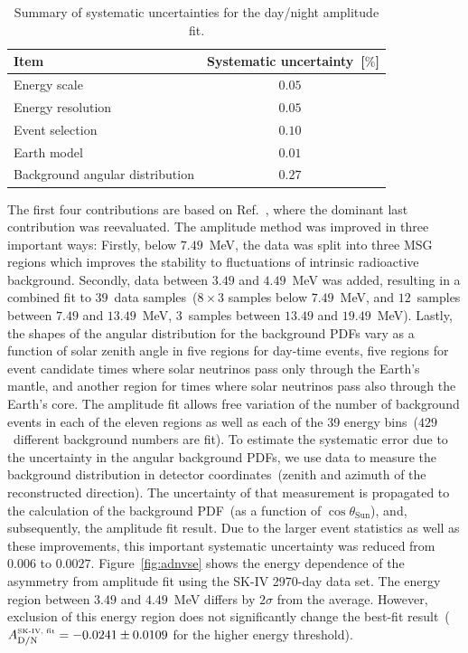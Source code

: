 \documentclass[aps,prd,reprint,superscriptaddress,floatfix,altaffilletter,nofootinbib]{revtex4-2}
\begin{document}
\begin{table}[htp]
    \begin{center}
    \caption{Summary of systematic uncertainties for the day/night amplitude fit.} 
    \label{tb:sys_dn}
        \begin{tabular}{lc}
        \hline
        \hline
        Item & Systematic uncertainty~[$\%$] \\ \hline
        Energy scale & $0.05\phantom{0}$ \\
        Energy resolution & $0.05\phantom{0}$ \\
        Event selection & $0.10\phantom{0}$ \\
        Earth model & $0.01\phantom{0}$ \\
        Background angular distribution & $0.27\phantom{0}$ \\   \hline
        \hline
        \end{tabular}
    \end{center}
\end{table}

The first four contributions are based on Ref.~\cite{Renshaw:2013dzu}, where the dominant last contribution was reevaluated. The amplitude method was improved in three important ways: Firstly, below $7.49$~MeV, the data was split into three MSG regions which improves the stability to fluctuations of intrinsic radioactive background. Secondly, data between $3.49$ and $4.49$~MeV was added, resulting in a combined fit to $39$~data samples~($8\times3$ samples below $7.49$~MeV, and $12$~samples between $7.49$ and $13.49$~MeV, $3$~samples between $13.49$ and $19.49$~MeV). Lastly, the shapes of the angular distribution for the background PDFs vary as a function of solar zenith angle in five regions for day-time events, five regions for event candidate times where solar neutrinos pass only through the Earth's mantle, and another region for times where solar neutrinos pass also through the Earth's core. The amplitude fit allows free variation of the number of background events in each of the eleven regions as well as each of the 39 energy bins~($429$~different background numbers are fit). To estimate the systematic error due to the uncertainty in the angular background PDFs, we use data to measure the background distribution in detector coordinates~(zenith and azimuth of the reconstructed direction). The uncertainty of that measurement is propagated to the calculation of the background PDF~(as a function of $\cos\theta_{\mathrm{Sun}}$), and, subsequently, the amplitude fit result. Due to the larger event statistics as well as these improvements, this important systematic uncertainty was reduced from $0.006$ to $0.0027$. Figure~\ref{fig:adnvse} shows the energy dependence of the asymmetry from amplitude fit using the SK-IV 2970-day data set. The energy region between $3.49$ and $4.49$~MeV differs by $2\sigma$ from the average. However, exclusion of this energy region does not significantly change the best-fit result~($ A_{\mathrm{D/N}}^{\mbox{\tiny SK-IV, fit}}=-0.0241\pm0.0109$ for the higher energy threshold). 
\end{document}
